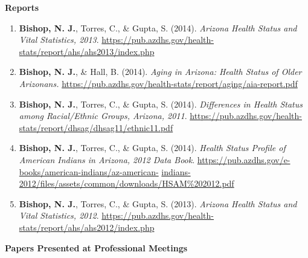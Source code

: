 \documentclass[
]{article}
\begin{document}
\textbf{Reports}

\begin{enumerate}
\def\labelenumi{\arabic{enumi}.}
\item
  \textbf{Bishop, N. J.}, Torres, C., \& Gupta, S. (2014). \emph{Arizona
  Health Status and Vital Statistics, 2013}.
  \url{https://pub.azdhs.gov/health-stats/report/ahs/ahs2013/index.php}
\item
  \textbf{Bishop, N. J.}, \& Hall, B. (2014). \emph{Aging in Arizona:
  Health Status of Older Arizonans.}
  \url{https://pub.azdhs.gov/health-stats/report/aging/aia-report.pdf}
\item
  \textbf{Bishop, N. J.}, Torres, C., \& Gupta, S. (2014).
  \emph{Differences in Health Status among Racial/Ethnic Groups,
  Arizona, 2011}.
  \url{https://pub.azdhs.gov/health-stats/report/dhsag/dhsag11/ethnic11.pdf}
\item
  \textbf{Bishop, N. J.}, Torres, C., \& Gupta, S. (2014). \emph{Health
  Status Profile of American Indians in Arizona, 2012 Data Book}.
  \href{https://pub.azdhs.gov/e-books/american-indians/az-american-indians-2012/files/assets/common/downloads/HSAM\%202012.pdf}{https://pub.azdhs.gov/e-books/american-indians/az-american-}
  \href{https://pub.azdhs.gov/e-books/american-indians/az-american-indians-2012/files/assets/common/downloads/HSAM\%202012.pdf}{indians-2012/files/assets/common/downloads/HSAM\%202012.pdf}
\item
  \textbf{Bishop, N. J.}, Torres, C., \& Gupta, S. (2013). \emph{Arizona
  Health Status and Vital Statistics, 2012}.
  \url{https://pub.azdhs.gov/health-stats/report/ahs/ahs2012/index.php}
\end{enumerate}

\textbf{Papers Presented at Professional Meetings}
\end{document}
